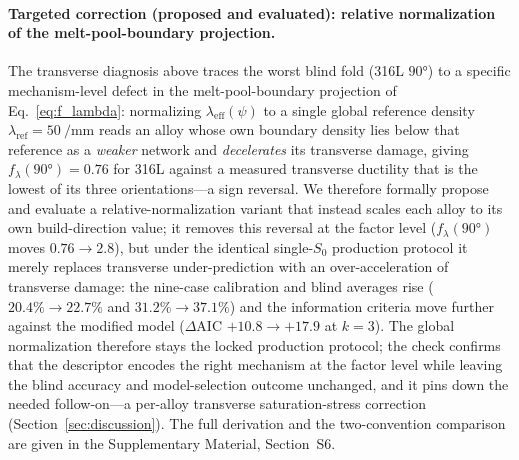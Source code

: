 \documentclass[12pt,a4paper,twocolumn]{article}
\begin{document}
\paragraph{Targeted correction (proposed and evaluated): relative normalization of the melt-pool-boundary projection.}
The transverse diagnosis above traces the worst blind fold (316L $\ang{90}$) to a specific mechanism-level defect in the melt-pool-boundary projection of Eq.~\eqref{eq:f_lambda}: normalizing $\lambda_{\mathrm{eff}}(\psi)$ to a single global reference density $\lambda_{\mathrm{ref}}=\SI{50}{\per\milli\meter}$ reads an alloy whose own boundary density lies below that reference as a \emph{weaker} network and \emph{decelerates} its transverse damage, giving $f_\lambda(\ang{90})=0.76$ for 316L against a measured transverse ductility that is the lowest of its three orientations---a sign reversal. We therefore formally propose and evaluate a relative-normalization variant that instead scales each alloy to its own build-direction value; it removes this reversal at the factor level ($f_\lambda(\ang{90})$ moves $0.76\to2.8$), but under the identical single-$S_0$ production protocol it merely replaces transverse under-prediction with an over-acceleration of transverse damage: the nine-case calibration and blind averages rise ($20.4\%\to22.7\%$ and $31.2\%\to37.1\%$) and the information criteria move further against the modified model ($\Delta\mathrm{AIC}$ $+10.8\to+17.9$ at $k=3$). The global normalization therefore stays the locked production protocol; the check confirms that the descriptor encodes the right mechanism at the factor level while leaving the blind accuracy and model-selection outcome unchanged, and it pins down the needed follow-on---a per-alloy transverse saturation-stress correction (Section~\ref{sec:discussion}). The full derivation and the two-convention comparison are given in the Supplementary Material, Section~S6.
\end{document}
